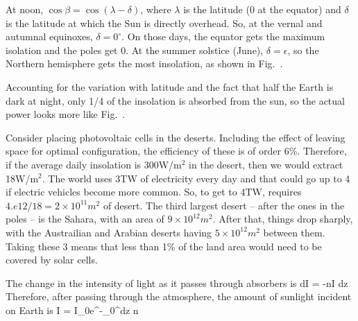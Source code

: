 \documentclass[11pt]{book}
\begin{document}
\item At noon, $\cos\beta=\cos(\lambda-\delta)$, where $\lambda$ is the latitude (0 at the equator) and $\delta$ is the latitude at which the Sun is directly overhead. So, at the vernal and autumnal equinoxes, $\delta=0^\circ$. On those days, the equator gets the maximum isolation and the poles get 0. At the summer solstice (June), $\delta=\epsilon$, so the Northern hemisphere gets the most insolation, as shown in Fig.~.
\item Accounting for the variation with latitude and the fact that half the Earth is dark at night, only 1/4 of the insolation is absorbed from the sun, so the actual power looks more like Fig.~.
\eei


Consider placing photovoltaic cells in the deserts. Including the effect of leaving space for optimal configuration, the efficiency of these is of order 6\%. Therefore, if the average daily insolation is 300W/m$^2$ in the desert, then we would extract 18W/m$^2$. The world uses 3TW of electricity every day and that could go up to 4 if electric vehicles become more common. So, to get to 4TW, requires $4.e12/18=2\times 10^{11}m^2$ of desert. The third largest desert -- after the ones in the poles -- is the Sahara, with an area of $9\times 10^{12}m^2$. After that, things drop sharply, with the Austrailian and Arabian deserts having $5\times 10^{12}m^2$ between them. Taking these 3 means that less than 1\% of the land area would need to be covered by solar cells.


The change in the intensity of light as it passes through absorbers is
\be
dI = -n\sigma I dz
\ee
Therefore, after passing through the atmosphere, the amount of sunlight incident on Earth is
\be
I = I_0e^{-\int_0^\infty dz n \sigma}
\ee
{}
\end{document}
